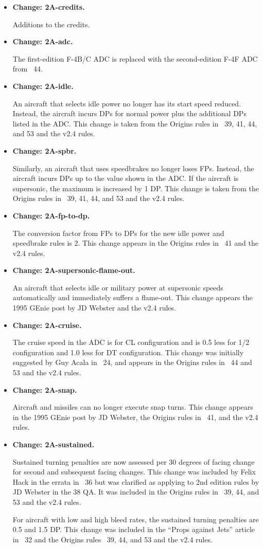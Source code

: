 \documentclass[10pt]{article}
\newcommand{\itemtag}[1]{\item \textbf{Change: #1.}\par}
\begin{document}
\begin{itemize}

    \itemtag{2A-credits} Additions to the credits.

    \itemtag{2A-adc} The first-edition F-4B/C ADC is replaced with the second-edition F-4F ADC from {\APJ}~44.

    \itemtag{2A-idle} An aircraft that selects idle power no longer has its start speed reduced. Instead, the aircraft incurs DPs for normal power plus the additional DPs listed in the ADC. This change is taken from the Origins rules in {\APJ}~39, 41, 44, and 53 and the v2.4 rules. 

    \itemtag{2A-spbr} Similarly, an aircraft that uses speedbrakes no longer loses FPs. Instead, the aircraft incurs DPs up to the value shown in the ADC. If the aircraft is supersonic, the maximum is increased by 1 DP. This change is taken from the Origins rules in {\APJ}~39, 41, 44, and 53 and the v2.4 rules.

    \itemtag{2A-fp-to-dp} The conversion factor from FPs to DPs for the new idle power and speedbrake rules is 2. This change appears in the Origins rules in {\APJ}~41 and the v2.4 rules.

    \itemtag{2A-supersonic-flame-out} An aircraft that selects idle or military power at supersonic speeds automatically and immediately suffers a flame-out. This change appears the 1995 GEnie post by JD Webster and the v2.4 rules.

    \itemtag{2A-cruise} The cruise speed in the ADC is for CL configuration and is 0.5 less for 1/2 configuration and 1.0 less for DT configuration. This change was initially suggested by Guy Acala in {\APJ}~24, and appears in the Origins rules in {\APJ}~44 and 53 and the v2.4 rules.

    \itemtag{2A-snap} Aircraft and missiles can no longer execute snap turns. This change appears in the 1995 GEnie post by JD Webster, the Origins rules in {\APJ}~41, and the v2.4 rules.

    \itemtag{2A-sustained} Sustained turning penalties are now assessed per 30 degrees of facing change for second and subsequent facing changes. This change was included by Felix Hack in the errata in {\APJ}~36 but was clarified as applying to 2nd edition rules by JD Webster in the {\APJ} 38 QA. It was included in the Origins rules in {\APJ}~39, 44, and 53 and the v2.4 rules.

    For aircraft with low and high bleed rates, the sustained turning penalties are 0.5 and 1.5 DP. This change was included in the “Props against Jets” article in {\APJ}~32 and the Origins rules {\APJ}~39, 44, and 53 and the v2.4 rules.


\end{itemize}
\end{document}
